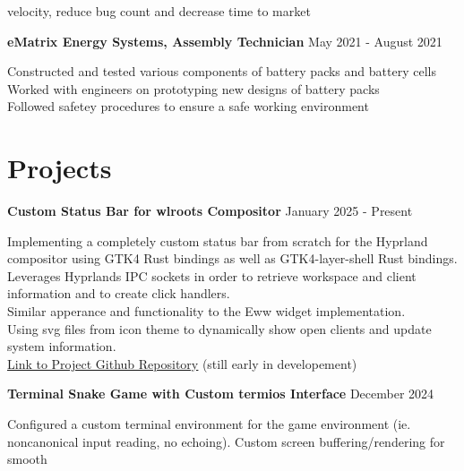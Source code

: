 \documentclass[letter,12pt]{article}
\begin{document}
velocity, reduce bug count and decrease time to market\\
\begin{tcolorbox}
[colback=gray!25,
  leftrule=0pt,
  rightrule=0pt,
  sharp corners]
 \textbf{eMatrix Energy Systems, Assembly Technician}
\hfill May 2021 - August 2021 
\end{tcolorbox}
\noindent 
\textbullet \- Constructed and tested various components of
battery packs and battery cells\\ 
\textbullet \- Worked with engineers on prototyping new designs of battery packs\\
\textbullet \- Followed safetey procedures to ensure a safe working environment
\vspace{-.5cm} 

\section*{Projects} 
\vspace{-.25cm}
\begin{tcolorbox}
[colback=gray!25,
  leftrule=0pt,
  rightrule=0pt,
  sharp corners]
    \textbf{Custom Status Bar for wlroots Compositor}
    \hfill January 2025 - Present
\end{tcolorbox}
\noindent
\textbullet \- Implementing a completely custom status
bar from scratch for the Hyprland compositor using
GTK4 Rust bindings as well as GTK4-layer-shell Rust bindings.\\
\textbullet \- Leverages Hyprlands IPC sockets in
order to retrieve workspace and client information and
to create click handlers.\\
\textbullet \- Similar apperance and functionality to
the Eww widget implementation.\\
\textbullet \- Using svg files from icon theme to dynamically
show open clients and update system information.\\
\textbullet \- {\color{cyan}\underline{\href{https://github.com/DMGDy/epic-bar-rs}{Link to Project Github Repository}}} (still early in developement)
\begin{tcolorbox}
[colback=gray!25,
  leftrule=0pt,
  rightrule=0pt,
  sharp corners]
\noindent\textbf{Terminal Snake Game with Custom termios Interface}
\hfill December 2024
\end{tcolorbox}
\noindent
\textbullet \- Configured a custom terminal environment
for the game environment (ie. noncanonical input reading, no echoing).
\textbullet \- Custom screen buffering/rendering for smooth
\end{document}
